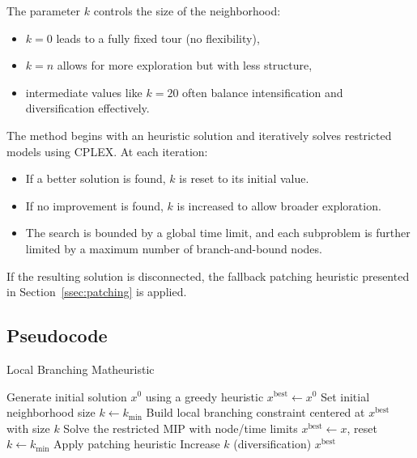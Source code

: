 The parameter \( k \) controls the size of the neighborhood:
\begin{itemize}
    \item \( k = 0 \) leads to a fully fixed tour (no flexibility),
    \item \( k = n \) allows for more exploration but with less structure,
    \item intermediate values like \( k = 20 \) often balance intensification and diversification effectively.
\end{itemize}

The method begins with an heuristic solution and iteratively solves restricted models using CPLEX. At each iteration:
\begin{itemize}
    \item If a better solution is found, \( k \) is reset to its initial value.
    \item If no improvement is found, \( k \) is increased to allow broader exploration.
    \item The search is bounded by a global time limit, and each subproblem is further limited by a maximum number of branch-and-bound nodes.
\end{itemize}

If the resulting solution is disconnected, the fallback patching heuristic presented in Section~\ref{ssec:patching} is applied.

\subsection{Pseudocode}

\begin{algorithm}[H]
\caption{Local Branching Matheuristic}
\begin{algorithmic}[1]
\State Generate initial solution \( x^0 \) using a greedy heuristic
\State \( x^{\text{best}} \gets x^0 \)
\State Set initial neighborhood size \( k \gets k_{\text{min}} \)
\Repeat
    \State Build local branching constraint centered at \( x^{\text{best}} \) with size \( k \)
    \State Solve the restricted MIP with node/time limits
        \State \( x^{\text{best}} \gets x \), reset \( k \gets k_{\text{min}} \)
        \State Apply patching heuristic
    \Else
        \State Increase \( k \) (diversification)
    \EndIf
{}
\State \Return \( x^{\text{best}} \)
\end{algorithmic}
\end{algorithm}
